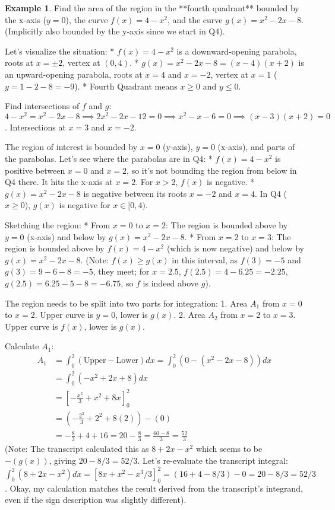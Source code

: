 \documentclass[11pt]{article}
\theoremstyle{definition}
\newtheorem{example}[theorem]{Example}
\theoremstyle{remark} %
\begin{document}
\begin{example}
Find the area of the region in the **fourth quadrant** bounded by the x-axis ($y=0$), the curve $f(x) = 4-x^2$, and the curve $g(x) = x^2 - 2x - 8$. (Implicitly also bounded by the y-axis since we start in Q4).

Let's visualize the situation:
*   $f(x) = 4-x^2$ is a downward-opening parabola, roots at $x=\pm 2$, vertex at $(0, 4)$.
*   $g(x) = x^2 - 2x - 8 = (x-4)(x+2)$ is an upward-opening parabola, roots at $x=4$ and $x=-2$, vertex at $x=1$ ($y=1-2-8=-9$).
*   Fourth Quadrant means $x \ge 0$ and $y \le 0$.

Find intersections of $f$ and $g$:
$4-x^2 = x^2 - 2x - 8 \implies 2x^2 - 2x - 12 = 0 \implies x^2 - x - 6 = 0 \implies (x-3)(x+2) = 0$. Intersections at $x=3$ and $x=-2$.

The region of interest is bounded by $x=0$ (y-axis), $y=0$ (x-axis), and parts of the parabolas. Let's see where the parabolas are in Q4:
*   $f(x)=4-x^2$ is positive between $x=0$ and $x=2$, so it's not bounding the region from below in Q4 there. It hits the x-axis at $x=2$. For $x>2$, $f(x)$ is negative.
*   $g(x)=x^2-2x-8$ is negative between its roots $x=-2$ and $x=4$. In Q4 ($x \ge 0$), $g(x)$ is negative for $x \in [0, 4)$.

Sketching the region:
*   From $x=0$ to $x=2$: The region is bounded above by $y=0$ (x-axis) and below by $g(x)=x^2-2x-8$.
*   From $x=2$ to $x=3$: The region is bounded above by $f(x)=4-x^2$ (which is now negative) and below by $g(x)=x^2-2x-8$. (Note: $f(x) \ge g(x)$ in this interval, as $f(3)=-5$ and $g(3)=9-6-8=-5$, they meet; for $x=2.5$, $f(2.5)=4-6.25=-2.25$, $g(2.5)=6.25-5-8=-6.75$, so $f$ is indeed above $g$).

The region needs to be split into two parts for integration:
1.  Area $A_1$ from $x=0$ to $x=2$. Upper curve is $y=0$, lower is $g(x)$.
2.  Area $A_2$ from $x=2$ to $x=3$. Upper curve is $f(x)$, lower is $g(x)$.

Calculate $A_1$:
\begin{align*} A_1 &= \int_0^2 (\text{Upper} - \text{Lower}) dx = \int_0^2 (0 - (x^2-2x-8)) dx \\ &= \int_0^2 (-x^2 + 2x + 8) dx \\ &= \left[ -\frac{x^3}{3} + x^2 + 8x \right]_0^2 \\ &= \left( -\frac{2^3}{3} + 2^2 + 8(2) \right) - (0) \\ &= -\frac{8}{3} + 4 + 16 = 20 - \frac{8}{3} = \frac{60-8}{3} = \frac{52}{3} \end{align*}
(Note: The transcript calculated this as $8+2x-x^2$ which seems to be $-(g(x))$, giving $20 - 8/3 = 52/3$. Let's re-evaluate the transcript integral: $\int_0^2 (8+2x-x^2) dx = [8x+x^2-x^3/3]_0^2 = (16+4-8/3)-0 = 20-8/3 = 52/3$. Okay, my calculation matches the result derived from the transcript's integrand, even if the sign description was slightly different).


\end{example}
\end{document}
